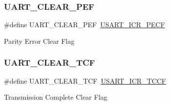 \subsubsection{\texorpdfstring{UART\_CLEAR\_PEF}{UART\_CLEAR\_PEF}}
{\footnotesize\ttfamily \#define U\+A\+R\+T\+\_\+\+C\+L\+E\+A\+R\+\_\+\+P\+EF~\mbox{\hyperlink{group___peripheral___registers___bits___definition_ga404185136eb68f679e82e0187d66e411}{U\+S\+A\+R\+T\+\_\+\+I\+C\+R\+\_\+\+P\+E\+CF}}}

Parity Error Clear Flag \mbox{\label{group___u_a_r_t___i_t___c_l_e_a_r___flags_gadfbfe4df408d1d09ff2adc1ddad3de09}} 
\subsubsection{\texorpdfstring{UART\_CLEAR\_TCF}{UART\_CLEAR\_TCF}}
{\footnotesize\ttfamily \#define U\+A\+R\+T\+\_\+\+C\+L\+E\+A\+R\+\_\+\+T\+CF~\mbox{\hyperlink{group___peripheral___registers___bits___definition_gacf92ea54425a962dde662b10b61d0250}{U\+S\+A\+R\+T\+\_\+\+I\+C\+R\+\_\+\+T\+C\+CF}}}

Transmission Complete Clear Flag 